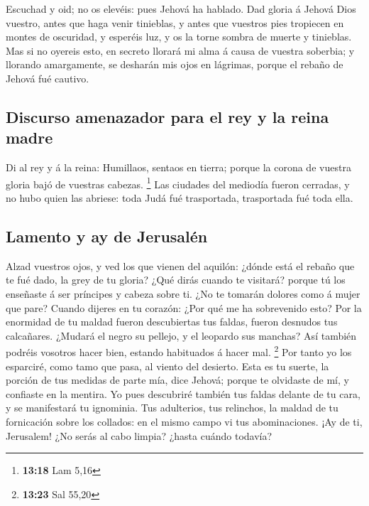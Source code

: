  Escuchad y oid; no os elevéis: pues Jehová ha hablado.
 Dad gloria á Jehová Dios vuestro, antes que haga venir
tinieblas, y antes que vuestros pies tropiecen en montes de oscuridad, y
esperéis luz, y os la torne sombra de muerte y tinieblas. 
Mas si no oyereis esto, en secreto llorará mi alma á causa de vuestra
soberbia; y llorando amargamente, se desharán mis ojos en lágrimas,
porque el rebaño de Jehová fué cautivo.

\hypertarget{discurso-amenazador-para-el-rey-y-la-reina-madre}{%
\subsection{Discurso amenazador para el rey y la reina
madre}\label{discurso-amenazador-para-el-rey-y-la-reina-madre}}

 Di al rey y á la reina: Humillaos, sentaos en tierra;
porque la corona de vuestra gloria bajó de vuestras cabezas. \footnote{\textbf{13:18}
  Lam 5,16}  Las ciudades del mediodía fueron cerradas, y
no hubo quien las abriese: toda Judá fué trasportada, trasportada fué
toda ella.

\hypertarget{lamento-y-ay-de-jerusaluxe9n}{%
\subsection{Lamento y ay de
Jerusalén}\label{lamento-y-ay-de-jerusaluxe9n}}

 Alzad vuestros ojos, y ved los que vienen del aquilón:
¿dónde está el rebaño que te fué dado, la grey de tu gloria?
 ¿Qué dirás cuando te visitará? porque tú los enseñaste á
ser príncipes y cabeza sobre ti. ¿No te tomarán dolores como á mujer que
pare?  Cuando dijeres en tu corazón: ¿Por qué me ha
sobrevenido esto? Por la enormidad de tu maldad fueron descubiertas tus
faldas, fueron desnudos tus calcañares.  ¿Mudará el negro
su pellejo, y el leopardo sus manchas? Así también podréis vosotros
hacer bien, estando habituados á hacer mal. \footnote{\textbf{13:23} Sal
  55,20}  Por tanto yo los esparciré, como tamo que pasa,
al viento del desierto.  Esta es tu suerte, la porción de
tus medidas de parte mía, dice Jehová; porque te olvidaste de mí, y
confiaste en la mentira.  Yo pues descubriré también tus
faldas delante de tu cara, y se manifestará tu ignominia. 
Tus adulterios, tus relinchos, la maldad de tu fornicación sobre los
collados: en el mismo campo vi tus abominaciones. ¡Ay de ti, Jerusalem!
¿No serás al cabo limpia? ¿hasta cuándo todavía?

